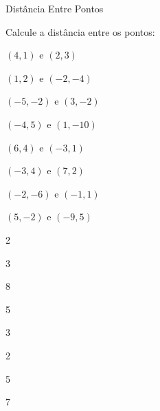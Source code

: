 
\begin{exercicios}{Distância Entre Pontos}
    
    \begin{exercicio}
        Calcule a distância entre os pontos:
        \begin{alphalist}[2]
            \item $(4,1)$ e $(2,3)$
            \item $(1,2)$ e $(-2,-4)$
            \item $(-5,-2)$ e $(3,-2)$
            \item $(-4,5)$ e $(1,-10)$
            \item $(6,4)$ e $(-3,1)$
            \item $(-3,4)$ e $(7,2)$
            \item $(-2,-6)$ e $(-1,1)$
            \item $(5,-2)$ e $(-9,5)$
        \end{alphalist}
        \begin{answers}
            \begin{mathlist}[4]
                \item 2 
                \item 3 
                \item 8
                \item 5 
                \item 3 
                \item 2 
                \item 5 
                \item 7 
            \end{mathlist}
        \end{answers}
    \end{exercicio}
    

\end{exercicios}
